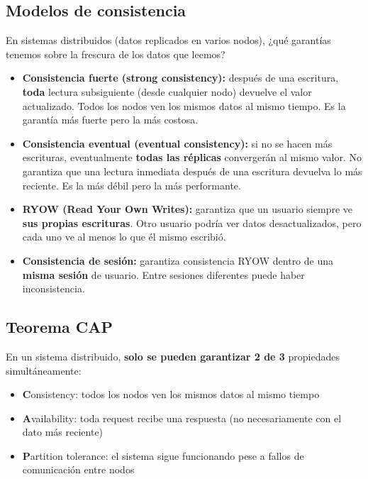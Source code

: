 \documentclass[11pt, a4paper]{article}
\begin{document}
\subsection{Modelos de consistencia}

En sistemas distribuidos (datos replicados en varios nodos), ¿qué garantías tenemos sobre la frescura de los datos que leemos?

\begin{itemize}
	\item \textbf{Consistencia fuerte (strong consistency):} después de una escritura, \textbf{toda} lectura subsiguiente (desde cualquier nodo) devuelve el valor actualizado. Todos los nodos ven los mismos datos al mismo tiempo. Es la garantía más fuerte pero la más costosa.

	\item \textbf{Consistencia eventual (eventual consistency):} si no se hacen más escrituras, eventualmente \textbf{todas las réplicas} convergerán al mismo valor. No garantiza que una lectura inmediata después de una escritura devuelva lo más reciente. Es la más débil pero la más performante.

	\item \textbf{RYOW (Read Your Own Writes):} garantiza que un usuario siempre ve \textbf{sus propias escrituras}. Otro usuario podría ver datos desactualizados, pero cada uno ve al menos lo que él mismo escribió.

	\item \textbf{Consistencia de sesión:} garantiza consistencia RYOW dentro de una \textbf{misma sesión} de usuario. Entre sesiones diferentes puede haber inconsistencia.
\end{itemize}

\subsection{Teorema CAP}

En un sistema distribuido, \textbf{solo se pueden garantizar 2 de 3} propiedades simultáneamente:

\begin{itemize}
	\item \textbf{C}onsistency: todos los nodos ven los mismos datos al mismo tiempo
	\item \textbf{A}vailability: toda request recibe una respuesta (no necesariamente con el dato más reciente)
	\item \textbf{P}artition tolerance: el sistema sigue funcionando pese a fallos de comunicación entre nodos
\end{itemize}
\end{document}
